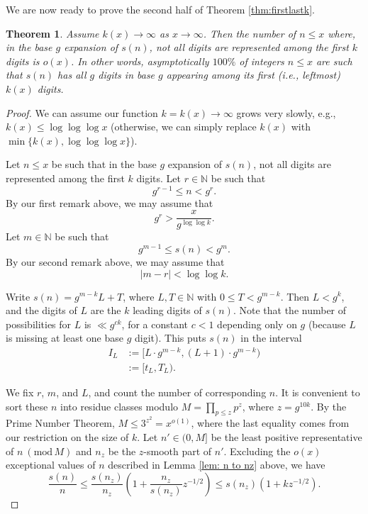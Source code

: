 \documentclass[11pt, reqno]{amsart}
\newtheorem{theorem}{Theorem}
\theoremstyle{remark}
\numberwithin{theorem}{section}
\numberwithin{proposition}{section}
\numberwithin{lemma}{section}
\numberwithin{corollary}{section}
\numberwithin{equation}{section}
\numberwithin{conjecture}{section}
\numberwithin{definition}{section}
\renewcommand{\bmod}[1]{\ ( \mathrm{mod} \, #1 )}
\begin{document}
	
 
	
	We are now ready to prove the second half of Theorem \ref{thm:firstlastk}. 
	
	\begin{theorem}\label{thm:firstk}
	Assume $k(x)\to \infty$ as $x\to \infty$. 	
	Then the number of $n\leq x$ where, in the base $g$ expansion of $s(n)$, not all digits are represented among the first $k$ digits is $o(x)$. In other words, asymptotically $100\%$ of integers $n\leq x$ are such that $s(n)$ has all $g$ digits in base $g$ appearing among its first (i.e., leftmost) $k(x)$ digits.
	\end{theorem}
	\begin{proof}
    We can assume our function $k=k(x) \to \infty$ grows very slowly, e.g., $k(x) \leq \log\log\log x$ (otherwise, we can simply replace $k(x)$ with $\min\{k(x),\log\log\log x\}$).
     
Let $n\leq x$ be such that in the base $g$ expansion of $s(n)$, not all digits are represented among the first $k$ digits. Let $r\in \mathbb{N}$ be such that \[ g^{r-1}\leq n<g^r. \] By our first remark above, we may assume that \[ g^r>\frac{x}{g^{\log\log k}}.\] Let $m\in \mathbb{N}$ be such that  \[ g^{m-1}\leq s(n)<g^m.\] By our second remark above, we may assume  that 
\[ |m-r| < \log \log k. \] 

Write $s(n) = g^{m-k} L  + T$, where $L, T\in \mathbb{N}$ with $0\leq T< g^{m-k}$. Then $L < g^{k}$, and the digits of $L$ are the $k$ leading digits of $s(n)$. Note that the number of possibilities for $L$ is $\ll g^{ck}$, for a constant $c < 1$ depending only on $g$ (because $L$ is missing at least one base $g$ digit). This puts $s(n)$ in the interval  \begin{align*} I_L&:=[L\cdot g^{m-k},(L+1)\cdot g^{m-k}) \\&:=[t_L,T_L). \end{align*} 


We fix $r$, $m$, and $L$, and count the number of corresponding $n$. It is convenient to sort these $n$ into residue classes modulo $M = \prod_{p \leq z} p^{z}$, where $z = g^{10k}$. By the Prime Number Theorem, $M \leq 3^{z^2} =x^{o(1)}$, where the last equality comes from our restriction on the size of $k$. Let  $n'\in (0,M]$ be the least positive representative of $n \bmod M$  and $n_{z}$ be the $z$-smooth part of $n'$. Excluding the $o(x)$ exceptional values of $n$ described in Lemma \ref{lem: n to nz} above, we have $$\frac{s(n)}{n} \leq \frac{s(n_z)}{n_z} \left(1 +\frac{n_z}{s(n_z)}  z^{-1/2}\right) \leq {s(n_z)} (1 + k z^{-1/2}).$$ 
    

\end{proof}
\end{document}
